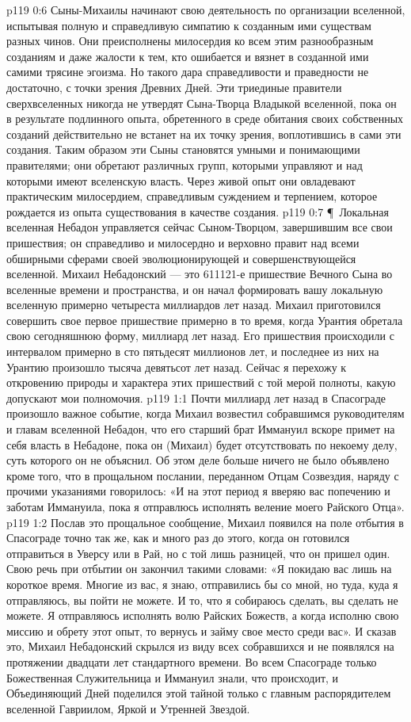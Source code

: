 \vs p119 0:6 Сыны\hyp{}Михаилы начинают свою деятельность по организации вселенной, испытывая полную и справедливую симпатию к созданным ими существам разных чинов. Они преисполнены милосердия ко всем этим разнообразным созданиям и даже жалости к тем, кто ошибается и вязнет в созданной ими самими трясине эгоизма. Но такого дара справедливости и праведности не достаточно, с точки зрения Древних Дней. Эти триединые правители сверхвселенных никогда не утвердят Сына\hyp{}Творца Владыкой вселенной, пока он в результате подлинного опыта, обретенного в среде обитания своих собственных созданий действительно не встанет на их точку зрения, воплотившись в сами эти создания. Таким образом эти Сыны становятся умными и понимающими правителями; они обретают  различных групп, которыми управляют и над которыми имеют вселенскую власть. Через живой опыт они овладевают практическим милосердием, справедливым суждением и терпением, которое рождается из опыта существования в качестве создания.
\vs p119 0:7 \P\ Локальная вселенная Небадон управляется сейчас Сыном\hyp{}Творцом, завершившим все свои пришествия; он справедливо и милосердно и верховно правит над всеми обширными сферами своей эволюционирующей и совершенствующейся вселенной. Михаил Небадонский --- это 611121\hyp{}е пришествие Вечного Сына во вселенные времени и пространства, и он начал формировать вашу локальную вселенную примерно четыреста миллиардов лет назад. Михаил приготовился совершить свое первое пришествие примерно в то время, когда Урантия обретала свою сегодняшнюю форму, миллиард лет назад. Его пришествия происходили с интервалом примерно в сто пятьдесят миллионов лет, и последнее из них на Урантию произошло тысяча девятьсот лет назад. Сейчас я перехожу к откровению природы и характера этих пришествий с той мерой полноты, какую допускают мои полномочия.
\vs p119 1:1 Почти миллиард лет назад в Спасограде произошло важное событие, когда Михаил возвестил собравшимся руководителям и главам вселенной Небадон, что его старший брат Иммануил вскоре примет на себя власть в Небадоне, пока он (Михаил) будет отсутствовать по некоему делу, суть которого он не объяснил. Об этом деле больше ничего не было объявлено кроме того, что в прощальном послании, переданном Отцам Созвездия, наряду с прочими указаниями говорилось: «И на этот период я вверяю вас попечению и заботам Иммануила, пока я отправлюсь исполнять веление моего Райского Отца».
\vs p119 1:2 Послав это прощальное сообщение, Михаил появился на поле отбытия в Спасограде точно так же, как и много раз до этого, когда он готовился отправиться в Уверсу или в Рай, но с той лишь разницей, что он пришел один. Свою речь при отбытии он закончил такими словами: «Я покидаю вас лишь на короткое время. Многие из вас, я знаю, отправились бы со мной, но туда, куда я отправляюсь, вы пойти не можете. И то, что я собираюсь сделать, вы сделать не можете. Я отправляюсь исполнять волю Райских Божеств, а когда исполню свою миссию и обрету этот опыт, то вернусь и займу свое место среди вас». И сказав это, Михаил Небадонский скрылся из виду всех собравшихся и не появлялся на протяжении двадцати лет стандартного времени. Во всем Спасограде только Божественная Служительница и Иммануил знали, что происходит, и Объединяющий Дней поделился этой тайной только с главным распорядителем вселенной Гавриилом, Яркой и Утренней Звездой.
